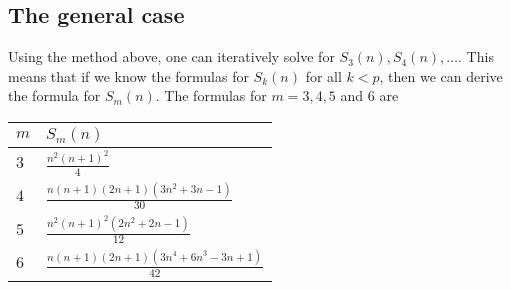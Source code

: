 \documentclass[12pt]{article}
\begin{document}
\subsection*{The general case}

Using the method above, one can iteratively solve for $S_3(n),S_4(n),\ldots$.  This means that if we know the formulas for $S_k(n)$ for all $k<p$, then we can derive the formula for $S_m(n)$.  The formulas for $m=3,4,5$ and $6$ are 
\begin{center}
\begin{tabular}{|l|l|}
\hline
$m$ & $S_m(n)$ \\
\hline\hline
$3$ & $\displaystyle{\frac{n^2(n+1)^2}{4}}$ \\
\hline
$4$ & $\displaystyle{\frac{n(n+1)(2n+1)(3n^2+3n-1)}{30}}$ \\
\hline
$5$ & $\displaystyle{\frac{n^2(n+1)^2(2n^2+2n-1)}{12}}$ \\
\hline
$6$ & $\displaystyle{\frac{n(n+1)(2n+1)(3n^4+6n^3-3n +1)}{42}}$ \\
\hline
\end{tabular}
\end{center}
\end{document}
